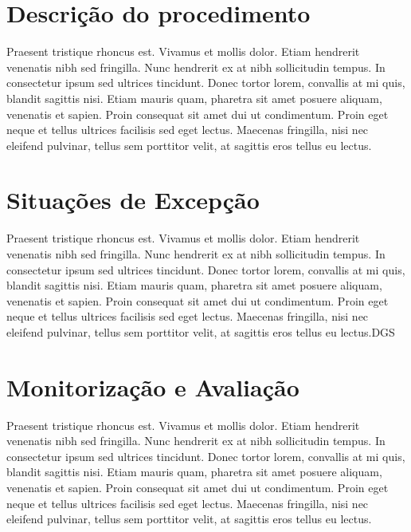 \section{Descrição do procedimento}\label{sec:descricao-do-procedimento}
Praesent tristique rhoncus est. Vivamus et mollis dolor. Etiam hendrerit venenatis nibh sed fringilla. Nunc hendrerit ex at nibh sollicitudin tempus. In consectetur ipsum sed ultrices tincidunt. Donec tortor lorem, convallis at mi quis, blandit sagittis nisi. Etiam mauris quam, pharetra sit amet posuere aliquam, venenatis et sapien. Proin consequat sit amet dui ut condimentum. Proin eget neque et tellus ultrices facilisis sed eget lectus. Maecenas fringilla, nisi nec eleifend pulvinar, tellus sem porttitor velit, at sagittis eros tellus eu lectus.

\section{Situações de Excepção}\label{sec:situacoes-de-excepcao}
Praesent tristique rhoncus est. Vivamus et mollis dolor. Etiam hendrerit venenatis nibh sed fringilla. Nunc hendrerit ex at nibh sollicitudin tempus. In consectetur ipsum sed ultrices tincidunt. Donec tortor lorem, convallis at mi quis, blandit sagittis nisi. Etiam mauris quam, pharetra sit amet posuere aliquam, venenatis et sapien. Proin consequat sit amet dui ut condimentum. Proin eget neque et tellus ultrices facilisis sed eget lectus. Maecenas fringilla, nisi nec eleifend pulvinar, tellus sem porttitor velit, at sagittis eros tellus eu lectus.\gls{DGS}

\section{Monitorização e Avaliação}\label{sec:monitorizacao-e-avaliacao}
Praesent tristique rhoncus est. Vivamus et mollis dolor. Etiam hendrerit venenatis nibh sed fringilla. Nunc hendrerit ex at nibh sollicitudin tempus. In consectetur ipsum sed ultrices tincidunt. Donec tortor lorem, convallis at mi quis, blandit sagittis nisi. Etiam mauris quam, pharetra sit amet posuere aliquam, venenatis et sapien. Proin consequat sit amet dui ut condimentum. Proin eget neque et tellus ultrices facilisis sed eget lectus. Maecenas fringilla, nisi nec eleifend pulvinar, tellus sem porttitor velit, at sagittis eros tellus eu lectus.
